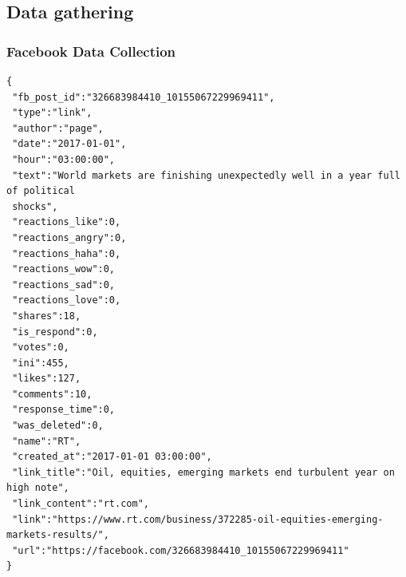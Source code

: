 \subsection{Data gathering}
\begin{frame}
\end{frame}
\begin{frame}[fragile]
 \frametitle{Facebook Data Collection}
 \tiny
 \begin{verbatim}
{
 "fb_post_id":"326683984410_10155067229969411",
 "type":"link",
 "author":"page",
 "date":"2017-01-01",
 "hour":"03:00:00",
 "text":"World markets are finishing unexpectedly well in a year full of political
 shocks",
 "reactions_like":0,
 "reactions_angry":0,
 "reactions_haha":0,
 "reactions_wow":0,
 "reactions_sad":0,
 "reactions_love":0,
 "shares":18,
 "is_respond":0,
 "votes":0,
 "ini":455,
 "likes":127,
 "comments":10,
 "response_time":0,
 "was_deleted":0,
 "name":"RT",
 "created_at":"2017-01-01 03:00:00",
 "link_title":"Oil, equities, emerging markets end turbulent year on high note",
 "link_content":"rt.com",
 "link":"https://www.rt.com/business/372285-oil-equities-emerging-markets-results/",
 "url":"https://facebook.com/326683984410_10155067229969411"
}
 \end{verbatim}
\end{frame}
